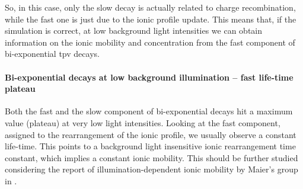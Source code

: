 	So, in this case, only the slow decay is actually related to charge recombination, while the fast one is just due to the ionic profile update.
	This means that, if the simulation is correct, at low background light intensities we can obtain information on the ionic mobility and concentration from the fast component of bi-exponential \gls{tpv} decays.
					
	\begin{figure}
	\end{figure}

	\paragraph{Bi-exponential decays at low background illumination -- fast life-time plateau}
	Both the fast and the slow component of bi-exponential decays hit a maximum value (plateau) at very low light intensities.
	Looking at the fast component, assigned to the rearrangement of the ionic profile, we usually observe a constant life-time.
	This points to a background light insensitive ionic rearrangement time constant, which implies a constant ionic mobility.
	This should be further studied considering the report of illumination-dependent ionic mobility by Maier's group in .

